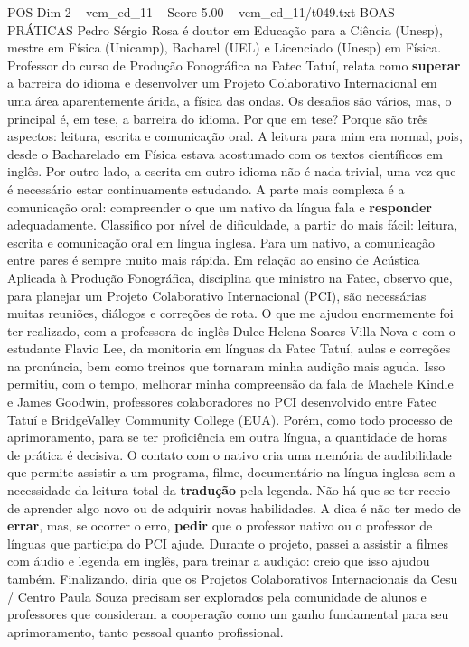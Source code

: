 \begin{textsample}{POS Dim 2 – vem\_ed\_11 – Score 5.00 – vem\_ed\_11/t049.txt}  \label{ex:f2_pos_153}
BOAS PRÁTICAS Pedro Sérgio Rosa é doutor em Educação para a Ciência (Unesp), mestre em Física (Unicamp), Bacharel (UEL) e Licenciado (Unesp) em Física.
Professor do curso de Produção Fonográfica na Fatec Tatuí, relata como \textbf{superar} a barreira do idioma e desenvolver um Projeto Colaborativo Internacional em uma área aparentemente árida, a física das ondas.
Os desafios são vários, mas, o principal é, em tese, a barreira do idioma.
Por que em tese?
Porque são três aspectos: leitura, escrita e comunicação oral.
A leitura para mim era normal, pois, desde o Bacharelado em Física estava acostumado com os textos científicos em inglês.
Por outro lado, a escrita em outro idioma não é nada trivial, uma vez que é necessário estar continuamente estudando.
A parte mais complexa é a comunicação oral: compreender o que um nativo da língua fala e \textbf{responder} adequadamente.
Classifico por nível de dificuldade, a partir do mais fácil: leitura, escrita e comunicação oral em língua inglesa.
Para um nativo, a comunicação entre pares é sempre muito mais rápida.
Em relação ao ensino de Acústica Aplicada à Produção Fonográfica, disciplina que ministro na Fatec, observo que, para planejar um Projeto Colaborativo Internacional (PCI), são necessárias muitas reuniões, diálogos e correções de rota.
O que me ajudou enormemente foi ter realizado, com a professora de inglês Dulce Helena Soares Villa Nova e com o estudante Flavio Lee, da monitoria em línguas da Fatec Tatuí, aulas e correções na pronúncia, bem como treinos que tornaram minha audição mais aguda.
Isso permitiu, com o tempo, melhorar minha compreensão da fala de Machele Kindle e James Goodwin, professores colaboradores no PCI desenvolvido entre Fatec Tatuí e BridgeValley Community College (EUA).
Porém, como todo processo de aprimoramento, para se ter proficiência em outra língua, a quantidade de horas de prática é decisiva.
O contato com o nativo cria uma memória de audibilidade que permite assistir a um programa, filme, documentário na língua inglesa sem a necessidade da leitura total da \textbf{tradução} pela legenda.
Não há que se ter receio de aprender algo novo ou de adquirir novas habilidades.
A dica é não ter medo de \textbf{errar}, mas, se ocorrer o erro, \textbf{pedir} que o professor nativo ou o professor de línguas que participa do PCI ajude.
Durante o projeto, passei a assistir a filmes com áudio e legenda em inglês, para treinar a audição: creio que isso ajudou também.
Finalizando, diria que os Projetos Colaborativos Internacionais da Cesu / Centro Paula Souza precisam ser explorados pela comunidade de alunos e professores que consideram a cooperação como um ganho fundamental para seu aprimoramento, tanto pessoal quanto profissional.

\end{textsample}
